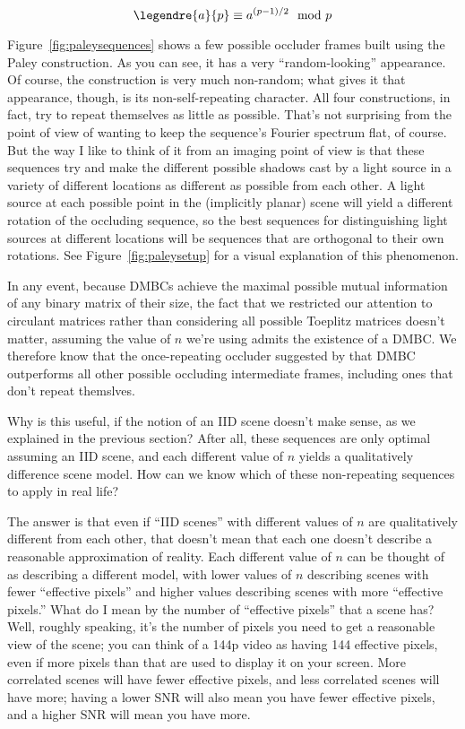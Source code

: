$$\legendre{a}{p} \equiv a^{(p-1)/2} \mod p$$

Figure~\ref{fig:paleysequences} shows a few possible occluder frames built using the Paley construction. As you can see, it has a very ``random-looking'' appearance. Of course, the construction is very much non-random; what gives it that appearance, though, is its non-self-repeating character. All four constructions, in fact, try to repeat themselves as little as possible. That's not surprising from the point of view of wanting to keep the sequence's Fourier spectrum flat, of course. But the way I like to think of it from an imaging point of view is that these sequences try and make the different possible shadows cast by a light source in a variety of different locations as different as possible from each other. A light source at each possible point in the (implicitly planar) scene will yield a different rotation of the occluding sequence, so the best sequences for distinguishing light sources at different locations will be sequences that are orthogonal to their own rotations. See Figure~\ref{fig:paleysetup} for a visual explanation of this phenomenon.

In any event, because DMBCs achieve the maximal possible mutual information of any binary matrix of their size, the fact that we restricted our attention to circulant matrices rather than considering all possible Toeplitz matrices doesn't matter, assuming the value of $n$ we're using admits the existence of a DMBC. We therefore know that the once-repeating occluder suggested by that DMBC outperforms all other possible occluding intermediate frames, including ones that don't repeat themslves.

Why is this useful, if the notion of an IID scene doesn't make sense, as we explained in the previous section? After all, these sequences are only optimal assuming an IID scene, and each different value of $n$ yields a qualitatively difference scene model. How can we know which of these non-repeating sequences to apply in real life?

The answer is that even if ``IID scenes'' with different values of $n$ are qualitatively different from each other, that doesn't mean that each one doesn't describe a reasonable approximation of reality. Each different value of $n$ can be thought of as describing a different model, with lower values of $n$ describing scenes with fewer ``effective pixels'' and higher values describing scenes with more ``effective pixels.'' What do I mean by the number of ``effective pixels'' that a scene has? Well, roughly speaking, it's the number of pixels you need to get a reasonable view of the scene; you can think of a 144p video as having 144 effective pixels, even if more pixels than that are used to display it on your screen. More correlated scenes will have fewer effective pixels, and less correlated scenes will have more; having a lower SNR will also mean you have fewer effective pixels, and a higher SNR will mean you have more.





